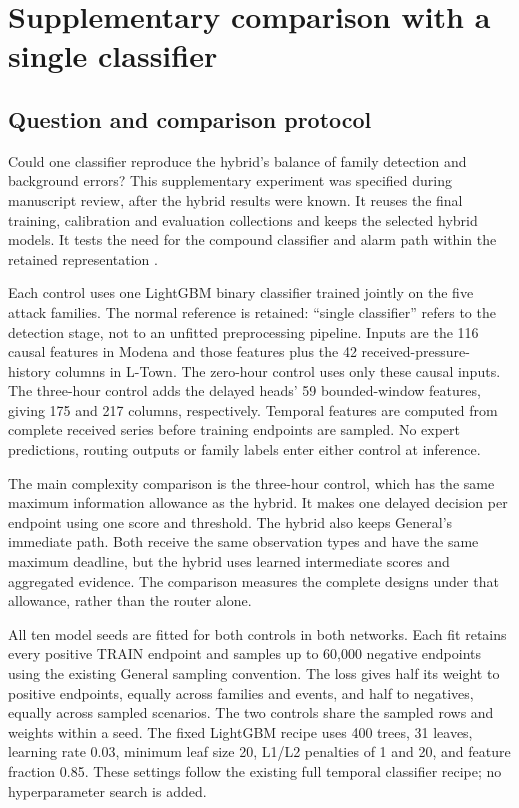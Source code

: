 \FloatBarrier
\section{Supplementary comparison with a single classifier}
\label{sec:singlebaseline}
\subsection{Question and comparison protocol}
Could one classifier reproduce the hybrid's balance of family detection and background errors? This supplementary experiment was specified during manuscript review, after the hybrid results were known. It reuses the final training, calibration and evaluation collections and keeps the selected hybrid models. It tests the need for the compound classifier and alarm path within the retained representation \cite{projectbaseline}.

Each control uses one LightGBM binary classifier trained jointly on the five attack families. The normal reference is retained: ``single classifier'' refers to the detection stage, not to an unfitted preprocessing pipeline. Inputs are the 116 causal features in Modena and those features plus the 42 received-pressure-history columns in L-Town. The zero-hour control uses only these causal inputs. The three-hour control adds the delayed heads' 59 bounded-window features, giving 175 and 217 columns, respectively. Temporal features are computed from complete received series before training endpoints are sampled. No expert predictions, routing outputs or family labels enter either control at inference.

The main complexity comparison is the three-hour control, which has the same maximum information allowance as the hybrid. It makes one delayed decision per endpoint using one score and threshold. The hybrid also keeps General's immediate path. Both receive the same observation types and have the same maximum deadline, but the hybrid uses learned intermediate scores and aggregated evidence. The comparison measures the complete designs under that allowance, rather than the router alone.

All ten model seeds are fitted for both controls in both networks. Each fit retains every positive TRAIN endpoint and samples up to 60,000 negative endpoints using the existing General sampling convention. The loss gives half its weight to positive endpoints, equally across families and events, and half to negatives, equally across sampled scenarios. The two controls share the sampled rows and weights within a seed. The fixed LightGBM recipe uses 400 trees, 31 leaves, learning rate 0.03, minimum leaf size 20, L1/L2 penalties of 1 and 20, and feature fraction 0.85. These settings follow the existing full temporal classifier recipe; no hyperparameter search is added.

